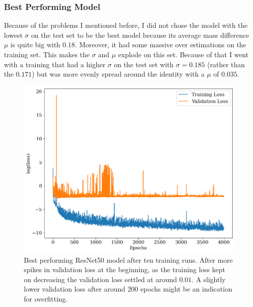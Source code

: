 \subsubsection*{Best Performing Model}
Because of the problems I mentioned before, I did not chose the model with the lowest $\sigma$ on the test set to be the best model because its average mass difference $\mu$ is quite big with $0.18$. Moreover, it had some massive over estimations on the training set. This makes the $\sigma$ and $\mu$ explode on this set. Because of that I went with a training that had a higher $\sigma$ on the test set with $\sigma = 0.185$ (rather than the $0.171$) but was more evenly spread around the identity with a $\mu$ of $0.035$.

\begin{figure}[H]
\centering
\includegraphics[width=.667\textwidth]{images/Chapter4/ResNet50/res50_best_history.png}
\caption{Best performing ResNet50 model after ten training runs. After more spikes in validation loss at the beginning, as the training loss kept on decreasing the validation loss settled at around $0.01$. A slightly lower validation loss after around $200$ epochs might be an indication for overfitting.} 
\label{fig:resnet50_best_history}
\end{figure}


